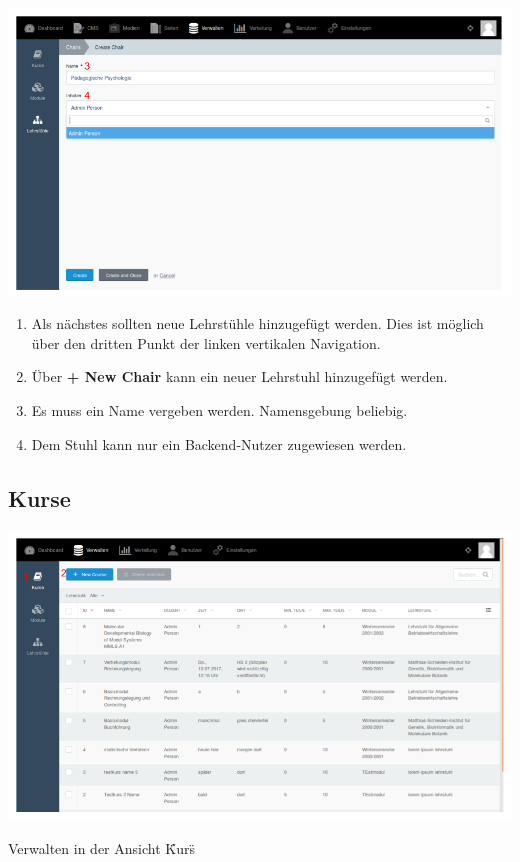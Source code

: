     \includegraphics[scale=0.3]{backend/img/chairs_2.png}
    
    \begin{enumerate}
     \item Als nächstes sollten neue Lehrstühle hinzugefügt werden. Dies ist möglich über den dritten Punkt der linken vertikalen Navigation.
     \item Über \textbf{+ New Chair} kann ein neuer Lehrstuhl hinzugefügt werden.
     \item Es muss ein Name vergeben werden. Namensgebung beliebig.
     \item Dem Stuhl kann nur ein Backend-Nutzer zugewiesen werden.
    \end{enumerate}

    \subsection{Kurse}
    
    \includegraphics[scale=0.3]{backend/img/verwalten_kurse.png}
      \caption{Verwalten in der Ansicht \"Kurs\"}

